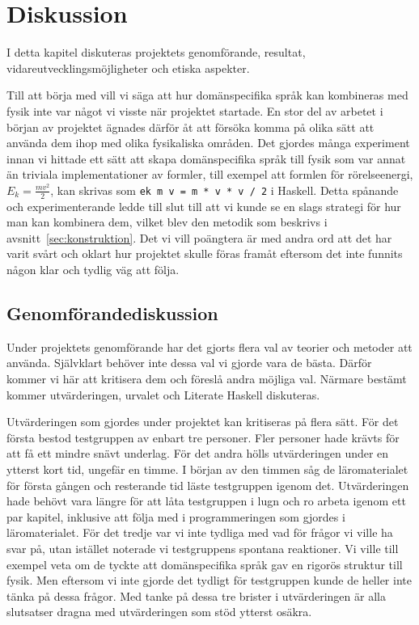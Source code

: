 
\chapter{Diskussion}

I detta kapitel diskuteras projektets genomförande, resultat,
vidareutvecklingsmöjligheter och etiska aspekter.

Till att börja med vill vi säga att hur domänspecifika språk kan kombineras med
fysik inte var något vi visste när projektet startade. En stor del av arbetet i
början av projektet ägnades därför åt att försöka komma på olika sätt att
använda dem ihop med olika fysikaliska områden. Det gjordes många experiment
innan vi hittade ett sätt att skapa domänspecifika språk till fysik som var annat än
triviala implementationer av formler, till exempel att formlen för
rörelseenergi, $E_k = \frac{mv^2}{2}$, kan skrivas som \texttt{ek m v = m * v *
v / 2} i Haskell. Detta spånande och experimenterande ledde till slut till att
vi kunde se en slags strategi för hur man kan kombinera dem, vilket blev den
metodik som beskrivs i avsnitt~\ref{sec:konstruktion}. Det vi vill poängtera är
med andra ord att det har varit svårt och oklart hur projektet skulle föras
framåt eftersom det inte funnits någon klar och tydlig väg att följa.

\section{Genomförandediskussion}

Under projektets genomförande har det gjorts flera val av teorier och metoder
att använda. Självklart behöver inte dessa val vi gjorde vara de bästa.
Därför kommer vi här att kritisera dem och föreslå andra möjliga val. Närmare
bestämt kommer utvärderingen, urvalet och Literate Haskell diskuteras.

Utvärderingen som gjordes under projektet kan kritiseras på flera sätt. För det
första bestod testgruppen av enbart tre personer. Fler
personer hade krävts för att få ett mindre snävt underlag. För det andra hölls
utvärderingen under en ytterst kort tid, ungefär en timme. I början av den
timmen såg de läromaterialet för första gången och resterande tid läste
testgruppen igenom det. Utvärderingen hade behövt vara längre för att låta testgruppen
i lugn och ro arbeta igenom ett par kapitel, inklusive att följa med i
programmeringen som gjordes i läromaterialet. För det tredje var vi inte tydliga
med vad för frågor vi ville ha svar på, utan istället noterade vi testgruppens
spontana reaktioner. Vi ville till exempel veta om de tyckte att domänspecifika
språk gav en rigorös struktur till fysik. Men eftersom vi inte gjorde det
tydligt för testgruppen kunde de heller inte tänka på dessa frågor. Med tanke på
dessa tre brister i utvärderingen är alla slutsatser dragna med utvärderingen
som stöd ytterst osäkra.

